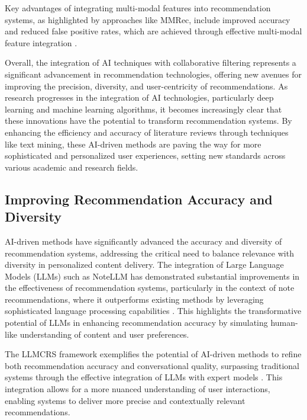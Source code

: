 Key advantages of integrating multi-modal features into recommendation systems, as highlighted by approaches like MMRec, include improved accuracy and reduced false positive rates, which are achieved through effective multi-modal feature integration \cite{tian2024mmrecllmbasedmultimodal}.

Overall, the integration of AI techniques with collaborative filtering represents a significant advancement in recommendation technologies, offering new avenues for improving the precision, diversity, and user-centricity of recommendations. As research progresses in the integration of AI technologies, particularly deep learning and machine learning algorithms, it becomes increasingly clear that these innovations have the potential to transform recommendation systems. By enhancing the efficiency and accuracy of literature reviews through techniques like text mining, these AI-driven methods are paving the way for more sophisticated and personalized user experiences, setting new standards across various academic and research fields. \cite{shang2024personalized,susnjak2024automatingresearchsynthesisdomainspecific}


\subsection{Improving Recommendation Accuracy and Diversity} \label{subsec:Improving Recommendation Accuracy and Diversity}



AI-driven methods have significantly advanced the accuracy and diversity of recommendation systems, addressing the critical need to balance relevance with diversity in personalized content delivery. The integration of Large Language Models (LLMs) such as NoteLLM has demonstrated substantial improvements in the effectiveness of recommendation systems, particularly in the context of note recommendations, where it outperforms existing methods by leveraging sophisticated language processing capabilities \cite{zhang2024notellmretrievablelargelanguage}. This highlights the transformative potential of LLMs in enhancing recommendation accuracy by simulating human-like understanding of content and user preferences.



The LLMCRS framework exemplifies the potential of AI-driven methods to refine both recommendation accuracy and conversational quality, surpassing traditional systems through the effective integration of LLMs with expert models \cite{feng2023largelanguagemodelenhanced}. This integration allows for a more nuanced understanding of user interactions, enabling systems to deliver more precise and contextually relevant recommendations.



